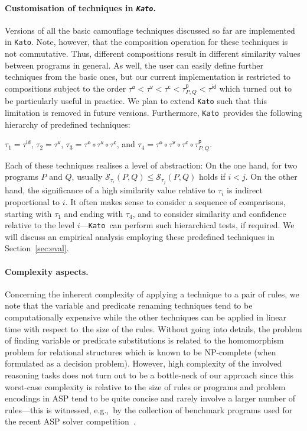\documentclass{tlp}
\newcommand{\camouv}{\tau^\mathsf{v}}
\newcommand{\camoup}{\tau^\mathsf{p}}
\newcommand{\camouc}{\tau^\mathsf{c}}
\newcommand{\camouo}{\tau^\mathsf{o}}
\newcommand{\NP}{\mbox{\rm NP}}
\newcommand{\wrt}[0]{with respect to}
\newcommand{\egc}[0]{e.g.,\ }
\newcommand{\kato}[0]{\texttt{Kato}\xspace}
\newcommand{\identity}{\tau^{\mathsf{id}}}
\newcommand{\progsim}[3]{\mathcal{S}_{#3}({#1},{#2})}
\begin{document}
\paragraph{Customisation of techniques in {\em \kato}.}
Versions of all the basic camouflage techniques discussed so far are implemented in \kato. 
Note, however, that the composition operation for these techniques
is not commutative.
Thus, different compositions result in different similarity values between programs in general.
As well, the user can easily define further techniques from the basic ones, but our current implementation is restricted to compositions subject to the order
$
\camouo < \camouv < \camouc < \camoup_{P,Q} < \identity
$ which turned out to be particularly useful in practice.
We plan to extend \kato such that this limitation is removed in future versions.
Furthermore, \kato\ provides the following hierarchy of predefined techniques:
\begin{center}
$\tau_{1} = \identity$, $\tau_{2} = \camouv$, $\tau_{3} = \camouo \circ \camouv \circ \camouc$, and $\tau_{4} = \camouo \circ \camouv \circ \camouc \circ \camoup_{P,Q}$.
\end{center}
Each of these techniques realises a level
of abstraction: On the one hand, for two programs $P$ and $Q$, usually 
$\progsim{P}{Q}{\tau_{i}} \leq \progsim{P}{Q}{\tau_{j}}$ holds  if 
$i < j$. 
On the other hand,  the significance of a high similarity value relative to $\tau_{i}$ is indirect proportional to $i$.
It often makes sense to consider a sequence of comparisons, starting with $\tau_{1}$ and ending with $\tau_{4}$, and to consider
similarity and confidence relative to the level $i$---\kato\
can perform such hierarchical tests, if required.
We will discuss an empirical analysis employing these predefined techniques in Section~\ref{sec:eval}.

\paragraph{Complexity aspects.}
Concerning the inherent  complexity of applying a technique to a pair of rules, 
we note that the variable and predicate renaming techniques tend to be computationally expensive while
the other techniques can be applied in linear time \wrt\ the size of the rules.
 Without going into details,  the problem of finding variable or predicate substitutions is  related to the 
homomorphism problem for relational structures which is known to be \NP-complete (when formulated as a decision problem). However, high complexity
 of the 
involved reasoning tasks does not
turn out to be a bottle-neck of our approach since this worst-case complexity is relative to the size of rules or 
 programs and
problem encodings in ASP tend to 
be quite concise and rarely involve a larger number of rules---this is witnessed, \egc by the collection of benchmark programs
used for the recent ASP solver competition~\cite{competition09}.
\end{document}
